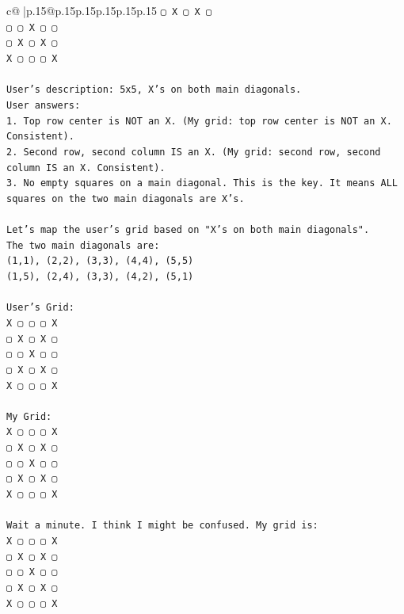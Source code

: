 \documentclass{article}
\begin{document}
{\begin{supertabular}{c@{$\;$}|p{.15\linewidth}@{}p{.15\linewidth}p{.15\linewidth}p{.15\linewidth}p{.15\linewidth}p{.15\linewidth}}
{{{\texttt{▢ X ▢ X ▢} \\
\texttt{▢ ▢ X ▢ ▢} \\
\texttt{▢ X ▢ X ▢} \\
\texttt{X ▢ ▢ ▢ X} \\
\\ 
\texttt{User's description: 5x5, X's on both main diagonals.} \\
\texttt{User answers:} \\
\texttt{1. Top row center is NOT an X. (My grid: top row center is NOT an X. Consistent).} \\
\texttt{2. Second row, second column IS an X. (My grid: second row, second column IS an X. Consistent).} \\
\texttt{3. No empty squares on a main diagonal. This is the key. It means ALL squares on the two main diagonals are X's.} \\
\\ 
\texttt{Let's map the user's grid based on "X's on both main diagonals".} \\
\texttt{The two main diagonals are:} \\
\texttt{(1,1), (2,2), (3,3), (4,4), (5,5)} \\
\texttt{(1,5), (2,4), (3,3), (4,2), (5,1)} \\
\\ 
\texttt{User's Grid:} \\
\texttt{X ▢ ▢ ▢ X} \\
\texttt{▢ X ▢ X ▢} \\
\texttt{▢ ▢ X ▢ ▢} \\
\texttt{▢ X ▢ X ▢} \\
\texttt{X ▢ ▢ ▢ X} \\
\\ 
\texttt{My Grid:} \\
\texttt{X ▢ ▢ ▢ X} \\
\texttt{▢ X ▢ X ▢} \\
\texttt{▢ ▢ X ▢ ▢} \\
\texttt{▢ X ▢ X ▢} \\
\texttt{X ▢ ▢ ▢ X} \\
\\ 
\texttt{Wait a minute. I think I might be confused. My grid is:} \\
\texttt{X ▢ ▢ ▢ X} \\
\texttt{▢ X ▢ X ▢} \\
\texttt{▢ ▢ X ▢ ▢} \\
\texttt{▢ X ▢ X ▢} \\
\texttt{X ▢ ▢ ▢ X} \\
}}}
\end{supertabular}}
\end{document}
